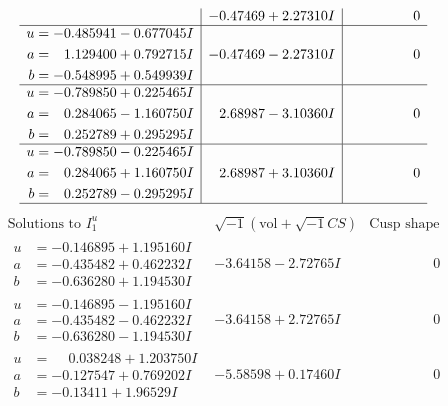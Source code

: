 \documentclass[1p]{elsarticle_modified}
\theoremstyle{definition}
\newcommand{\I}{\sqrt{-1}}
\begin{document}
$$\begin{array}{c|c|c}
 & -0.47469 + 2.27310 I & \phantom{-0.000000 } 0 \\ \hline\begin{aligned}
u &= -0.485941 - 0.677045 I \\
a &= \phantom{-}1.129400 + 0.792715 I \\
b &= -0.548995 + 0.549939 I\end{aligned}
 & -0.47469 - 2.27310 I & \phantom{-0.000000 } 0 \\ \hline\begin{aligned}
u &= -0.789850 + 0.225465 I \\
a &= \phantom{-}0.284065 - 1.160750 I \\
b &= \phantom{-}0.252789 + 0.295295 I\end{aligned}
 & \phantom{-}2.68987 - 3.10360 I & \phantom{-0.000000 } 0 \\ \hline\begin{aligned}
u &= -0.789850 - 0.225465 I \\
a &= \phantom{-}0.284065 + 1.160750 I \\
b &= \phantom{-}0.252789 - 0.295295 I\end{aligned}
 & \phantom{-}2.68987 + 3.10360 I & \phantom{-0.000000 } 0\\
 \hline 
 \end{array}$$\newpage$$\begin{array}{c|c|c}  
\text{Solutions to }I^u_{1}& \I (\text{vol} + \sqrt{-1}CS) & \text{Cusp shape}\\
 \hline 
\begin{aligned}
u &= -0.146895 + 1.195160 I \\
a &= -0.435482 + 0.462232 I \\
b &= -0.636280 + 1.194530 I\end{aligned}
 & -3.64158 - 2.72765 I & \phantom{-0.000000 } 0 \\ \hline\begin{aligned}
u &= -0.146895 - 1.195160 I \\
a &= -0.435482 - 0.462232 I \\
b &= -0.636280 - 1.194530 I\end{aligned}
 & -3.64158 + 2.72765 I & \phantom{-0.000000 } 0 \\ \hline\begin{aligned}
u &= \phantom{-}0.038248 + 1.203750 I \\
a &= -0.127547 + 0.769202 I \\
b &= -0.13411 + 1.96529 I\end{aligned}
 & -5.58598 + 0.17460 I & \phantom{-0.000000 } 0 \\ \hline\begin{aligned}

\end{aligned}
\end{array}$$
\end{document}
